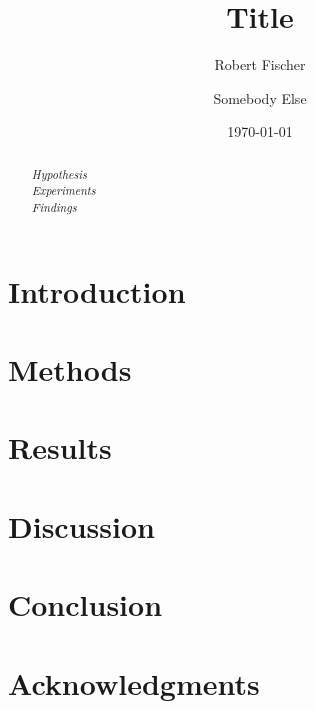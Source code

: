 \documentclass{article}
\begin{document}
	
\title{Title}
\author[1]{Robert Fischer}
\author[2]{Somebody Else}


\date{\today}
\maketitle

\begin{abstract}
		
\textit{Hypothesis}\\


\textit{Experiments}\\


\textit{Findings}\\


\end{abstract}

\section{Introduction}




\section{Methods}

 

\section{Results}

\section{Discussion}
 


\section{Conclusion}



\section*{Acknowledgments}

 

\end{document}
